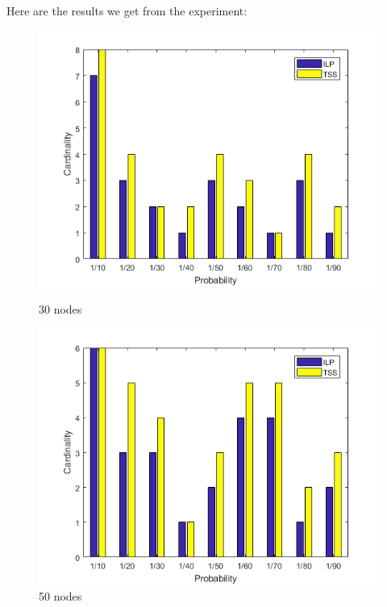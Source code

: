 Here are the results we get from the experiment:

\begin{figure}[h!]
\begin{minipage}[t]{0.50\textwidth}
\includegraphics[width=\linewidth,keepaspectratio=true]{images/rand30result.png}
\caption{30 nodes}

\end{minipage}
\begin{minipage}[t]{0.50\textwidth}
\includegraphics[width=\linewidth,keepaspectratio=true]{images/rand50result.png}
\caption{50 nodes}
\end{minipage}
\end{figure}

